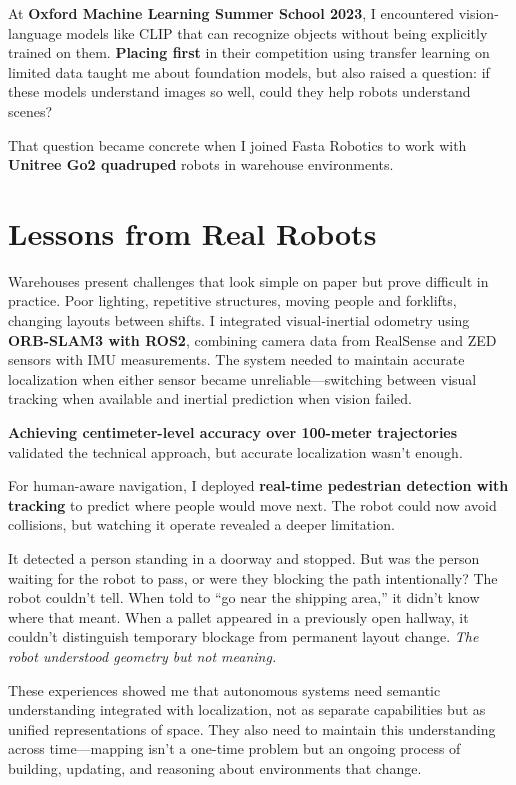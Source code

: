 \documentclass[12pt]{article}
\begin{document}
At \textbf{Oxford Machine Learning Summer School 2023}, I encountered vision-language models like CLIP that can recognize objects without being explicitly trained on them. \textbf{Placing first} in their competition using transfer learning on limited data taught me about foundation models, but also raised a question: if these models understand images so well, could they help robots understand scenes?

That question became concrete when I joined Fasta Robotics to work with \textbf{Unitree Go2 quadruped} robots in warehouse environments.

\section*{Lessons from Real Robots}

Warehouses present challenges that look simple on paper but prove difficult in practice. Poor lighting, repetitive structures, moving people and forklifts, changing layouts between shifts. I integrated visual-inertial odometry using \textbf{ORB-SLAM3 with ROS2}, combining camera data from RealSense and ZED sensors with IMU measurements. The system needed to maintain accurate localization when either sensor became unreliable—switching between visual tracking when available and inertial prediction when vision failed.

\textbf{Achieving centimeter-level accuracy over 100-meter trajectories} validated the technical approach, but accurate localization wasn't enough.

For human-aware navigation, I deployed \textbf{real-time pedestrian detection with tracking} to predict where people would move next. The robot could now avoid collisions, but watching it operate revealed a deeper limitation.

It detected a person standing in a doorway and stopped. But was the person waiting for the robot to pass, or were they blocking the path intentionally? The robot couldn't tell. When told to ``go near the shipping area,'' it didn't know where that meant. When a pallet appeared in a previously open hallway, it couldn't distinguish temporary blockage from permanent layout change. \textit{The robot understood geometry but not meaning.}

These experiences showed me that autonomous systems need semantic understanding integrated with localization, not as separate capabilities but as unified representations of space. They also need to maintain this understanding across time—mapping isn't a one-time problem but an ongoing process of building, updating, and reasoning about environments that change.
\end{document}
